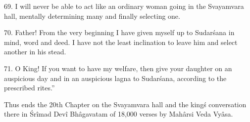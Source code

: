 69. I will never be able to act like an ordinary woman going in the Svayamvara hall, mentally determining many and finally selecting one.

70. Father! From the very beginning I have given myself up to Sudar\'sana in mind, word and deed. I have not the least inclination to leave him and select another in his stead.

71. O King! If you want to have my welfare, then give your daughter on an auspicious day and in an auspicious lagna to Sudar\'sana, according to the prescribed rites.''

Thus ends the 20th Chapter on the Svayamvara hall and the king\'s conversation there in \'Sr\^imad Dev\^i Bh\^agavatam of 18,000 verses by Mah\^arsi Veda Vy\^asa.